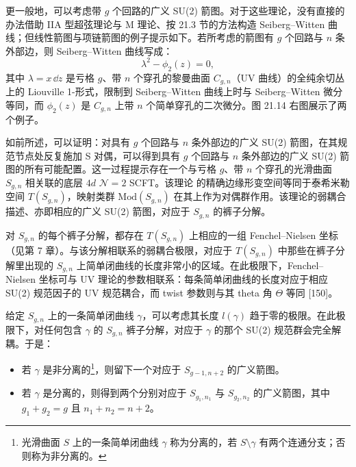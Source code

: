 更一般地，可以考虑带 $g$ 个回路的广义 SU(2) 箭图。对于这些理论，没有直接的办法借助 IIA 型超弦理论与 M 理论、按 21.3 节的方法构造 Seiberg–Witten 曲线；但线性箭图与项链箭图的例子提示如下。若所考虑的箭图有 $g$ 个回路与 $n$ 条外部边，则 Seiberg–Witten 曲线写成：
\[
\lambda^2-\phi_2(z)=0,
\]
其中 $\lambda=x\,\dd z$ 是亏格 $g$、带 $n$ 个穿孔的黎曼曲面 $C_{g,n}$（UV 曲线）的全纯余切丛上的 Liouville 1-形式，限制到 Seiberg–Witten 曲线上时与 Seiberg–Witten 微分等同，而 $\phi_2(z)$ 是 $C_{g,n}$ 上带 $n$ 个简单穿孔的二次微分。图 21.14 右图展示了两个例子。

如前所述，可以证明：对具有 $g$ 个回路与 $n$ 条外部边的广义 SU(2) 箭图，在其规范节点处反复施加 S 对偶，可以得到具有 $g$ 个回路与 $n$ 条外部边的广义 SU(2) 箭图的所有可能配置。这一过程提示存在一个与亏格 $g$、带 $n$ 个穿孔的光滑曲面 $S_{g,n}$ 相关联的底层 $4d$ $\mathcal{N}=2$ SCFT。该理论
的精确边缘形变空间等同于泰希米勒空间 $T(S_{g,n})$，映射类群 $\mathrm{Mod}(S_{g,n})$ 在其上作为对偶群作用。该理论的弱耦合描述、亦即相应的广义 SU(2) 箭图，对应于 $S_{g,n}$ 的裤子分解。

\begin{remark}[21.27] 对 $S_{g,n}$ 的每个裤子分解，都存在 $T(S_{g,n})$ 上相应的一组 Fenchel–Nielsen 坐标（见第 7 章）。与该分解相联系的弱耦合极限，对应于 $T(S_{g,n})$ 中那些在裤子分解里出现的 $S_{g,n}$ 上简单闭曲线的长度非常小的区域。在此极限下，Fenchel–Nielsen 坐标可与 UV 理论的参数相联系：每条简单闭曲线的长度对应于相应 SU(2) 规范因子的 UV 规范耦合，而 twist 参数则与其 theta 角 $\Theta$ 等同 [150]。
\end{remark}

\begin{remark}[21.28] 给定 $S_{g,n}$ 上的一条简单闭曲线 $\gamma$，可以考虑其长度 $l(\gamma)$ 趋于零的极限。在此极限下，对任何包含 $\gamma$ 的 $S_{g,n}$ 裤子分解，对应于 $\gamma$ 的那个 SU(2) 规范群会完全解耦。于是：
\begin{itemize}
\item 若 $\gamma$ 是非分离的\footnote{光滑曲面 $S$ 上的一条简单闭曲线 $\gamma$ 称为分离的，若 $S\setminus\gamma$ 有两个连通分支；否则称为非分离的。}，则留下一个对应于 $S_{g-1,n+2}$ 的广义箭图。
\item 若 $\gamma$ 是分离的，则得到两个分别对应于 $S_{g_1,n_1}$ 与 $S_{g_2,n_2}$ 的广义箭图，其中 $g_1+g_2=g$ 且 $n_1+n_2=n+2$。
\end{itemize}
\end{remark}

